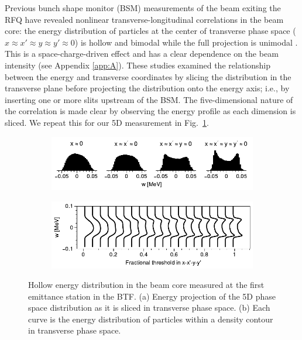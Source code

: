 \documentclass[letterpaper,
               keeplastbox,
               nospread,
               biblatex,
              ]{jacow}
\begin{document}
Previous bunch shape monitor (BSM) measurements of the beam exiting the RFQ have revealed nonlinear transverse-longitudinal correlations in the beam core: the energy distribution of particles at the center of transverse phase space ($x \approx x' \approx y \approx y' \approx 0$) is hollow and bimodal while the full projection is unimodal \cite{CatheyPRL}. This is a space-charge-driven effect \cite{Ruisard2021-hollow} and has a clear dependence on the beam intensity (see Appendix \ref{app:A}). These studies examined the relationship between the energy and transverse coordinates by slicing the distribution in the transverse plane before projecting the distribution onto the energy axis; i.e., by inserting one or more slits upstream of the BSM. The five-dimensional nature of the correlation is made clear by observing the energy profile as each dimension is sliced. We repeat this for our 5D measurement in Fig.~\ref{fig:hollow_a}.
%
\begin{figure}[!t]
    \centering
    \begin{subfigure}{\columnwidth}
        \includegraphics[width=\textwidth]{w_slices.pdf}
        \caption{}
        \label{fig:hollow_a}
    \end{subfigure}
    \begin{subfigure}{\columnwidth}
        \includegraphics[width=\textwidth]{4Dcontour_dE2.pdf}
        \caption{}
        \label{fig:hollow_b}
    \end{subfigure}
    \caption{Hollow energy distribution in the beam core measured at the first emittance station in the BTF. (a) Energy projection of the 5D phase space distribution as it is sliced in transverse phase space. (b) Each curve is the energy distribution of particles within a density contour in transverse phase space.}
    \label{fig:hollow}
\end{figure}
%
\end{document}
